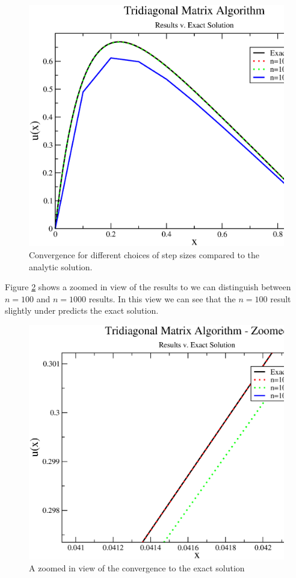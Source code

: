 \documentclass[%
oneside,                 %
final,                   %
10pt]{article}
\begin{document}
\begin{figure}[H]\label{fig:comp}
  \centering
    \includegraphics[width=1.2\textwidth]{comp.eps}
    \caption{Convergence for different choices of step sizes compared to the analytic solution.}
\end{figure}

Figure \ref{fig:compzoom} shows a zoomed in view of the results to we can distinguish between $n=100$ and $n=1000$ results.  In this view we can see that the $n=100$ result slightly under predicts the exact solution. 

\begin{figure}[H]\label{fig:compzoom}
  \centering
    \includegraphics[width=1.2\textwidth]{compzoom.eps}
    \caption{A zoomed in view of the convergence to the exact solution}
\end{figure}
\end{document}
